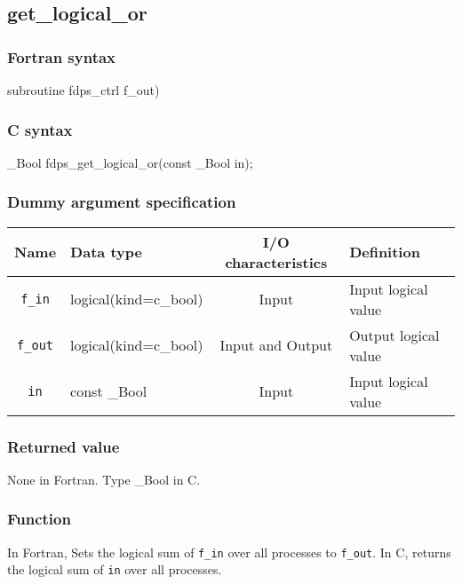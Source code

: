\subsection{get\_logical\_or}
\subsubsection*{Fortran syntax}
\begin{screen}
\begin{spverbatim}
subroutine fdps_ctrl%
                                     f_out)
\end{spverbatim}
\end{screen}

\subsubsection*{C syntax}
\begin{screen}
\begin{spverbatim}
_Bool fdps_get_logical_or(const _Bool in);
\end{spverbatim}
\end{screen}

\subsubsection*{Dummy argument specification}
\begin{table}[h]
\begin{tabularx}{\linewidth}{cXcX}
\toprule
\rowcolor{Snow2}
Name & Data type & I/O characteristics & Definition \\
\midrule
\verb|f_in| & logical(kind=c\_bool) & Input & Input logical value\\
\verb|f_out| & logical(kind=c\_bool) & Input and Output & Output logical value\\
\verb|in| & const \_Bool & Input & Input logical value\\
\bottomrule
\end{tabularx}
\end{table}

\subsubsection*{Returned value}
None in Fortran. Type \_Bool in C.

\subsubsection*{Function}
In Fortran, Sets the logical sum of {\tt f\_in} over all processes to \texttt{f\_out}. In C, returns the logical sum of \texttt{in} over all processes.
\clearpage


